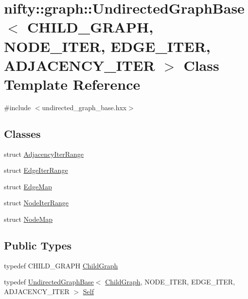 \hypertarget{classnifty_1_1graph_1_1UndirectedGraphBase}{}\section{nifty\+:\+:graph\+:\+:Undirected\+Graph\+Base$<$ C\+H\+I\+L\+D\+\_\+\+G\+R\+A\+P\+H, N\+O\+D\+E\+\_\+\+I\+T\+E\+R, E\+D\+G\+E\+\_\+\+I\+T\+E\+R, A\+D\+J\+A\+C\+E\+N\+C\+Y\+\_\+\+I\+T\+E\+R $>$ Class Template Reference}
\label{classnifty_1_1graph_1_1UndirectedGraphBase}


{\ttfamily \#include $<$undirected\+\_\+graph\+\_\+base.\+hxx$>$}

\subsection*{Classes}
\begin{DoxyCompactItemize}
\item 
struct \hyperlink{structnifty_1_1graph_1_1UndirectedGraphBase_1_1AdjacencyIterRange}{Adjacency\+Iter\+Range}
\item 
struct \hyperlink{structnifty_1_1graph_1_1UndirectedGraphBase_1_1EdgeIterRange}{Edge\+Iter\+Range}
\item 
struct \hyperlink{structnifty_1_1graph_1_1UndirectedGraphBase_1_1EdgeMap}{Edge\+Map}
\item 
struct \hyperlink{structnifty_1_1graph_1_1UndirectedGraphBase_1_1NodeIterRange}{Node\+Iter\+Range}
\item 
struct \hyperlink{structnifty_1_1graph_1_1UndirectedGraphBase_1_1NodeMap}{Node\+Map}
\end{DoxyCompactItemize}
\subsection*{Public Types}
\begin{DoxyCompactItemize}
\item 
typedef C\+H\+I\+L\+D\+\_\+\+G\+R\+A\+P\+H \hyperlink{classnifty_1_1graph_1_1UndirectedGraphBase_af2541cf9fb91440ff0a7b56dd5a6be29}{Child\+Graph}
\item 
typedef \hyperlink{classnifty_1_1graph_1_1UndirectedGraphBase}{Undirected\+Graph\+Base}$<$ \hyperlink{classnifty_1_1graph_1_1UndirectedGraphBase_af2541cf9fb91440ff0a7b56dd5a6be29}{Child\+Graph}, N\+O\+D\+E\+\_\+\+I\+T\+E\+R, E\+D\+G\+E\+\_\+\+I\+T\+E\+R, A\+D\+J\+A\+C\+E\+N\+C\+Y\+\_\+\+I\+T\+E\+R $>$ \hyperlink{classnifty_1_1graph_1_1UndirectedGraphBase_a3a637f240a8d05794be99e5f290a71b9}{Self}
\end{DoxyCompactItemize}

